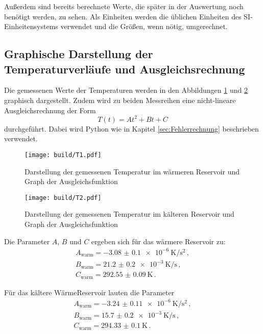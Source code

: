Außerdem sind bereits berechnete Werte,
die später in der Auswertung noch benötigt werden, zu sehen. Als Einheiten werden
die üblichen Einheiten des SI-Einheitensystems verwendet und die Größen, wenn nötig,
umgerechnet.

\subsection{Graphische Darstellung der Temperaturverläufe und Ausgleichsrechnung}
Die gemessenen Werte der Temperaturen werden in den Abbildungen \ref{fig:temp1} und \ref{fig:temp2}
graphisch dargestellt. Zudem wird zu beiden Messreihen eine nicht-lineare
Ausgleichsrechnung der Form
\begin{equation}
  T(t)=At^2+Bt+C
\end{equation}
durchgeführt. Dabei wird Python wie in Kapitel \ref{sec:Fehlerrechnung} beschrieben
verwendet.

\begin{figure}
  \centering
  \texttt{[image: build/T1.pdf]}
  \caption{Darstellung der gemessenen Temperatur im wärmeren Reservoir
   und Graph der Ausgleichsfunktion}
  \label{fig:temp1}
\end{figure}

\begin{figure}
  \centering
  \texttt{[image: build/T2.pdf]}
  \caption{Darstellung der gemessenen Temperatur im kälteren Reservoir
   und Graph der Ausgleichsfunktion}
  \label{fig:temp2}
\end{figure}

Die Parameter $A$, $B$ und $C$ ergeben sich für das wärmere Reservoir zu:
\begin{align*}
  A_\text{warm}=\SI{-3.08(010)e-6}{\kelvin\per\second\squared}  \,, \\
  B_\text{warm}=\SI{21.2(02)e-3}{\kelvin\per\second} \,,  \\
  C_\text{warm}=\SI{292.55(009)}{\kelvin}  \,.
\end{align*}

Für das kältere WärmeReservoir lauten die Parameter
\begin{align*}
  A_\text{warm}=\SI{-3.24(011)e-6}{\kelvin\per\second\squared}  \,, \\
  B_\text{warm}=\SI{15.7(02)e-3}{\kelvin\per\second} \,,  \\
  C_\text{warm}=\SI{294.33(010)}{\kelvin}  \,.
\end{align*}
